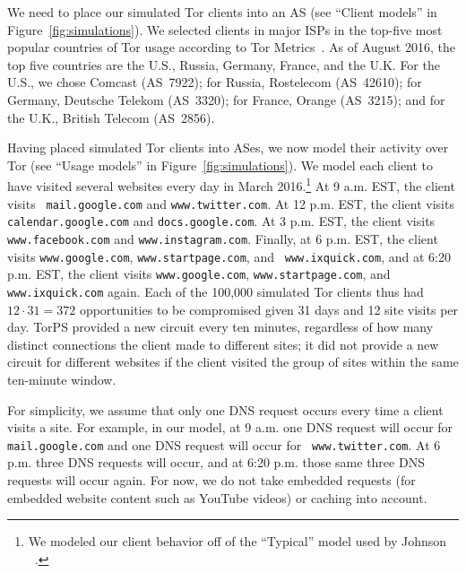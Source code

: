 We need to place our simulated Tor clients into an AS (see ``Client models'' in
Figure~\ref{fig:simulations}).  We selected clients in major ISPs in the
top-five most popular countries of Tor usage according to Tor
Metrics~\cite{metrics-countries}.  As of August 2016, the top five countries are
the U.S., Russia, Germany, France, and the U.K.  For the U.S., we chose Comcast
(AS~7922); for Russia, Rostelecom (AS~42610); for Germany, Deutsche Telekom
(AS~3320); for France, Orange (AS~3215); and for the U.K., British Telecom
(AS~2856).

Having placed simulated Tor clients into ASes, we now model their activity over
Tor (see ``Usage models'' in Figure~\ref{fig:simulations}).  We model each
client to have visited several websites every day in March 2016.\footnote{We
modeled our client behavior off of the ``Typical'' model used by Johnson
\ea~\cite[\S~5.1.2]{Johnson2013a}.}  At 9 a.m. EST, the client visits {\tt
mail.google.com} and {\tt www.twitter.com}.  At 12 p.m. EST, the client visits
{\tt calendar.google.com} and {\tt docs.google.com}. At 3 p.m. EST, the client
visits {\tt www.facebook.com} and {\tt www.instagram.com}.  Finally, at 6 p.m.
EST, the client visits {\tt www.google.com}, {\tt www.startpage.com}, and {\tt
www.ixquick.com}, and at 6:20 p.m. EST, the client visits {\tt www.google.com},
{\tt www.startpage.com}, and {\tt www.ixquick.com} again. Each of the 100,000
simulated Tor clients thus had $12 \cdot 31 = 372$ opportunities to be
compromised given 31 days and 12 site visits per day.  TorPS provided a new
circuit every ten minutes, regardless of how many distinct connections the
client made to different sites; it did not provide a new circuit for different
websites if the client visited the group of sites within the same ten-minute
window.

For simplicity, we assume that only one DNS request occurs every time a client
visits a site. For example, in our model, at 9 a.m. one DNS request will occur
for {\tt mail.google.com} and one DNS request will occur for {\tt
www.twitter.com}. At 6 p.m. three DNS requests will occur, and at 6:20 p.m.
those same three DNS requests will occur again.   For now, we do not take
embedded requests (\ie for embedded website content such as YouTube videos) or
caching into account.

